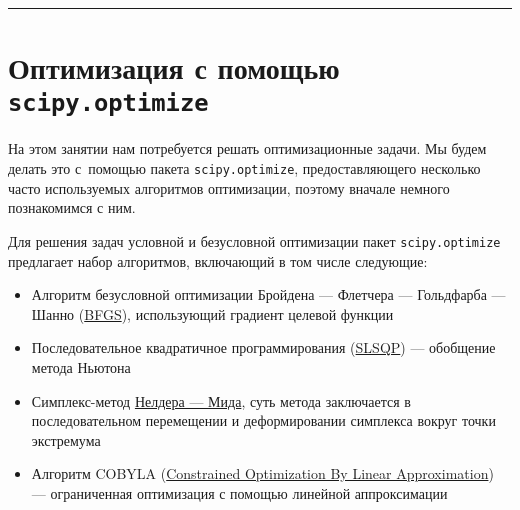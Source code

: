 \documentclass[11pt,a4paper]{article}
\renewcommand{\linethickness}{0.1ex}
\providecommand{\tightlist}{%
      \setlength{\itemsep}{0pt}\setlength{\parskip}{0pt}}
\begin{document}
    \begin{center}\rule{0.5\linewidth}{\linethickness}\end{center}

    \hypertarget{ux43eux43fux442ux438ux43cux438ux437ux430ux446ux438ux44f-ux441-ux43fux43eux43cux43eux449ux44cux44e-scipy.optimize}{%
\section{\texorpdfstring{Оптимизация с помощью
\texttt{scipy.optimize}}{Оптимизация с помощью scipy.optimize}}\label{ux43eux43fux442ux438ux43cux438ux437ux430ux446ux438ux44f-ux441-ux43fux43eux43cux43eux449ux44cux44e-scipy.optimize}}

    На этом занятии нам потребуется решать оптимизационные задачи. Мы будем
делать это с~помощью пакета \texttt{scipy.optimize}, предоставляющего
несколько часто используемых алгоритмов оптимизации, поэтому вначале
немного познакомимся с ним.

    Для решения задач условной и безусловной оптимизации пакет
\texttt{scipy.optimize} предлагает набор алгоритмов, включающий в том
числе следующие:

\begin{itemize}
\tightlist
\item
  Алгоритм безусловной оптимизации Бройдена --- Флетчера --- Гольдфарба
  --- Шанно
  (\href{https://ru.wikipedia.org/wiki/\%D0\%90\%D0\%BB\%D0\%B3\%D0\%BE\%D1\%80\%D0\%B8\%D1\%82\%D0\%BC_\%D0\%91\%D1\%80\%D0\%BE\%D0\%B9\%D0\%B4\%D0\%B5\%D0\%BD\%D0\%B0_\%E2\%80\%94_\%D0\%A4\%D0\%BB\%D0\%B5\%D1\%82\%D1\%87\%D0\%B5\%D1\%80\%D0\%B0_\%E2\%80\%94_\%D0\%93\%D0\%BE\%D0\%BB\%D1\%8C\%D0\%B4\%D1\%84\%D0\%B0\%D1\%80\%D0\%B1\%D0\%B0_\%E2\%80\%94_\%D0\%A8\%D0\%B0\%D0\%BD\%D0\%BD\%D0\%BE}{BFGS}),
  использующий градиент целевой функции
\item
  Последовательное квадратичное программирования
  (\href{https://ru.wikipedia.org/wiki/\%D0\%9F\%D0\%BE\%D1\%81\%D0\%BB\%D0\%B5\%D0\%B4\%D0\%BE\%D0\%B2\%D0\%B0\%D1\%82\%D0\%B5\%D0\%BB\%D1\%8C\%D0\%BD\%D0\%BE\%D0\%B5_\%D0\%BA\%D0\%B2\%D0\%B0\%D0\%B4\%D1\%80\%D0\%B0\%D1\%82\%D0\%B8\%D1\%87\%D0\%BD\%D0\%BE\%D0\%B5_\%D0\%BF\%D1\%80\%D0\%BE\%D0\%B3\%D1\%80\%D0\%B0\%D0\%BC\%D0\%BC\%D0\%B8\%D1\%80\%D0\%BE\%D0\%B2\%D0\%B0\%D0\%BD\%D0\%B8\%D0\%B5}{SLSQP})
  --- обобщение метода Ньютона
\item
  Симплекс-метод
  \href{https://ru.wikipedia.org/wiki/\%D0\%9C\%D0\%B5\%D1\%82\%D0\%BE\%D0\%B4_\%D0\%9D\%D0\%B5\%D0\%BB\%D0\%B4\%D0\%B5\%D1\%80\%D0\%B0_\%E2\%80\%94_\%D0\%9C\%D0\%B8\%D0\%B4\%D0\%B0}{Нелдера
  --- Мида}, суть метода заключается в последовательном перемещении и
  деформировании симплекса вокруг точки экстремума
\item
  Алгоритм COBYLA
  (\href{https://cossan.co.uk/wiki/index.php/COBYLA}{Constrained
  Optimization By Linear Approximation}) --- ограниченная оптимизация с
  помощью линейной аппроксимации
\end{itemize}
\end{document}
